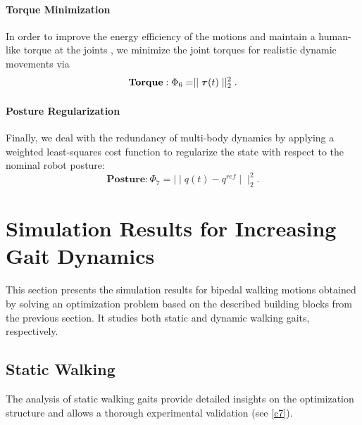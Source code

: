 \paragraph{Torque Minimization}
In order to improve the energy efficiency of the motions and maintain a human-like torque at the joints \cite{kim1994modeling}, we minimize the joint torques for realistic dynamic movements via
\begin{equation*} 
\textbf{Torque}: \Phi_6=\mid\mid \bm{\mathit{\tau}}(t)\mid\mid^2_2.
\end{equation*}
\paragraph{Posture Regularization}
Finally, we deal with the redundancy of multi-body dynamics by applying a weighted least-squares cost function to regularize the state with respect to the nominal robot posture:
\begin{equation*} 
\textbf{Posture}: \Phi_7=\mid\mid q(t)-q^{ref}\mid\mid^2_2.
\end{equation*}


\section{Simulation Results for Increasing Gait Dynamics}
This section presents the simulation results for bipedal walking motions obtained by solving an optimization problem based on the described building blocks from the previous section. It studies both static and dynamic walking gaits, respectively.

\subsection{Static Walking}
The analysis of static walking gaits provide detailed insights on the optimization structure and allows a thorough experimental validation (see \cref{c7}).

